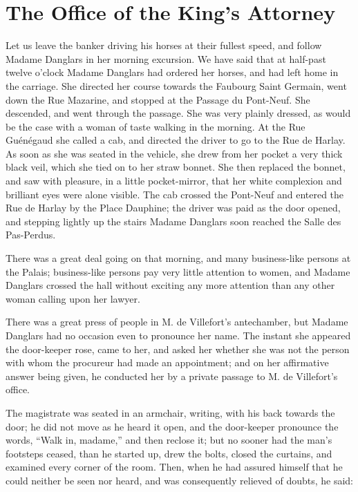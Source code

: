 \chapter{The Office of the King’s Attorney}

Let us leave the banker driving his horses at their fullest speed, and
follow Madame Danglars in her morning excursion. We have said that at
half-past twelve o’clock Madame Danglars had ordered her horses, and
had left home in the carriage. She directed her course towards the
Faubourg Saint Germain, went down the Rue Mazarine, and stopped at the
Passage du Pont-Neuf. She descended, and went through the passage. She
was very plainly dressed, as would be the case with a woman of taste
walking in the morning. At the Rue Guénégaud she called a cab, and
directed the driver to go to the Rue de Harlay. As soon as she was
seated in the vehicle, she drew from her pocket a very thick black
veil, which she tied on to her straw bonnet. She then replaced the
bonnet, and saw with pleasure, in a little pocket-mirror, that her
white complexion and brilliant eyes were alone visible. The cab crossed
the Pont-Neuf and entered the Rue de Harlay by the Place Dauphine; the
driver was paid as the door opened, and stepping lightly up the stairs
Madame Danglars soon reached the Salle des Pas-Perdus.

There was a great deal going on that morning, and many business-like
persons at the Palais; business-like persons pay very little attention
to women, and Madame Danglars crossed the hall without exciting any
more attention than any other woman calling upon her lawyer.

There was a great press of people in M. de Villefort’s antechamber, but
Madame Danglars had no occasion even to pronounce her name. The instant
she appeared the door-keeper rose, came to her, and asked her whether
she was not the person with whom the procureur had made an appointment;
and on her affirmative answer being given, he conducted her by a
private passage to M. de Villefort’s office.

The magistrate was seated in an armchair, writing, with his back
towards the door; he did not move as he heard it open, and the
door-keeper pronounce the words, “Walk in, madame,” and then reclose
it; but no sooner had the man’s footsteps ceased, than he started up,
drew the bolts, closed the curtains, and examined every corner of the
room. Then, when he had assured himself that he could neither be seen
nor heard, and was consequently relieved of doubts, he said:

